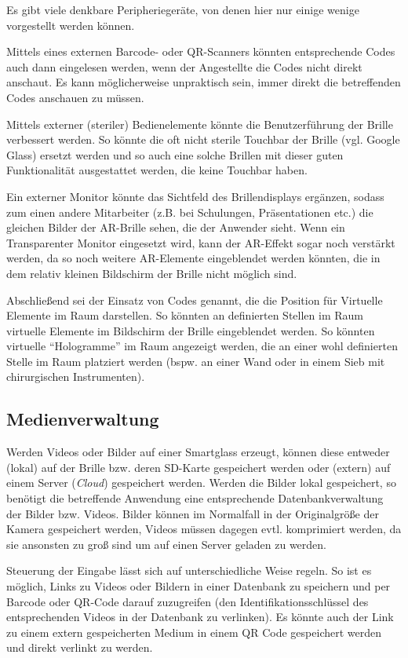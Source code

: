 Es gibt viele denkbare Peripheriegeräte, von denen hier nur einige wenige vorgestellt werden können.

Mittels eines externen Barcode- oder QR-Scanners könnten entsprechende Codes auch dann eingelesen werden, wenn der Angestellte die Codes nicht direkt anschaut. Es kann möglicherweise unpraktisch sein, immer direkt die betreffenden Codes anschauen zu müssen. 

Mittels externer (steriler) Bedienelemente könnte die Benutzerführung der Brille verbessert werden. So könnte die oft nicht sterile Touchbar der Brille (vgl. Google Glass) ersetzt werden und so auch eine solche Brillen mit dieser guten Funktionalität ausgestattet werden, die keine Touchbar haben. 

Ein externer Monitor könnte das Sichtfeld des Brillendisplays ergänzen, sodass zum einen andere Mitarbeiter (z.B. bei Schulungen, Präsentationen etc.) die gleichen Bilder der AR-Brille sehen, die der Anwender sieht. Wenn ein Transparenter Monitor eingesetzt wird, kann der AR-Effekt sogar noch verstärkt werden, da so noch weitere AR-Elemente eingeblendet werden könnten, die in dem relativ kleinen Bildschirm der Brille nicht möglich sind.

Abschließend sei der Einsatz von Codes genannt, die die Position für Virtuelle Elemente im Raum darstellen. So könnten an definierten Stellen im Raum virtuelle Elemente im Bildschirm der Brille eingeblendet werden. So könnten virtuelle \enquote{Hologramme} im Raum angezeigt werden, die an einer wohl definierten Stelle im Raum platziert werden (bspw. an einer Wand oder in einem Sieb mit chirurgischen Instrumenten).
%
%
\subsection{Medienverwaltung}
\label{sec:Medienverwaltung}
Werden Videos oder Bilder auf einer Smartglass erzeugt, können diese entweder (lokal) auf der Brille bzw. deren SD-Karte gespeichert werden oder (extern) auf einem Server (\emph{Cloud}) gespeichert werden. Werden die Bilder lokal gespeichert, so benötigt die betreffende Anwendung eine entsprechende Datenbankverwaltung der Bilder bzw. Videos. Bilder können im Normalfall in der Originalgröße der Kamera gespeichert werden, Videos müssen dagegen evtl. komprimiert werden, da sie ansonsten zu groß sind um auf einen Server geladen zu werden. 

Steuerung der Eingabe lässt sich auf unterschiedliche Weise regeln. So ist es möglich, Links zu Videos oder Bildern in einer Datenbank zu speichern und per Barcode oder QR-Code darauf zuzugreifen (den Identifikationsschlüssel des entsprechenden Videos in der Datenbank zu verlinken). Es könnte auch der Link zu einem extern gespeicherten Medium in einem QR Code gespeichert werden und direkt verlinkt zu werden. 

